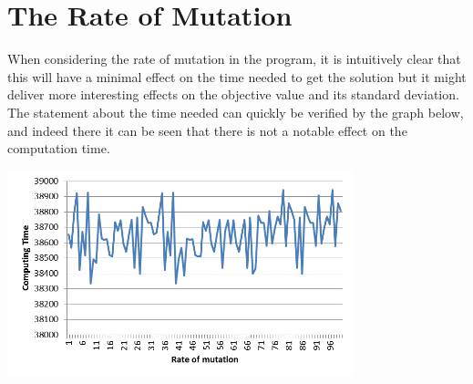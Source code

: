 \section{The Rate of Mutation}
When considering the rate of mutation in the program, it is intuitively clear that this will have a minimal effect on the time needed to get the solution but it might deliver more interesting effects on the objective value and its standard deviation.
The statement about the time needed can quickly be verified by the graph below, and indeed there it can be seen that there is not a notable effect on the computation time.
\par
\begin{centering}
		\includegraphics[height=6cm]{CTRM}
\end{centering}



